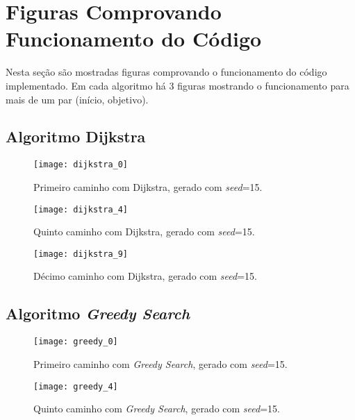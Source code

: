 \documentclass[brazil, 12pt]{article}
\begin{document}
\section{Figuras Comprovando Funcionamento do Código}
Nesta seção são mostradas figuras comprovando o funcionamento do código implementado. Em cada algoritmo há 3 figuras mostrando o funcionamento para mais de um par (início, objetivo).
\subsection{Algoritmo Dijkstra}
\begin{figure}[H]
	\centering
	\texttt{[image: dijkstra\_0]} %
	\caption{Primeiro caminho com Dijkstra, gerado com \textit{seed}=15.} %
	\label{fig:dijkstra_0}  %
\end{figure}

\begin{figure}[H]
	\centering
	\texttt{[image: dijkstra\_4]} %
	\caption{Quinto caminho com Dijkstra, gerado com \textit{seed}=15.} %
	\label{fig:dijkstra_4}  %
\end{figure}

\begin{figure}[H]
	\centering
	\texttt{[image: dijkstra\_9]} %
	\caption{Décimo caminho com Dijkstra, gerado com \textit{seed}=15.} %
	\label{fig:dijkstra_9}  %
\end{figure}

\subsection{Algoritmo \emph{Greedy Search}}
\begin{figure}[H]
	\centering
	\texttt{[image: greedy\_0]} %
	\caption{Primeiro caminho com \textit{Greedy Search}, gerado com \textit{seed}=15.} %
	\label{fig:greedy_0}  %
\end{figure}

\begin{figure}[H]
	\centering
	\texttt{[image: greedy\_4]} %
	\caption{Quinto caminho com \textit{Greedy Search}, gerado com \textit{seed}=15.} %
	\label{fig:greedy_4}  %
\end{figure}
\end{document}

